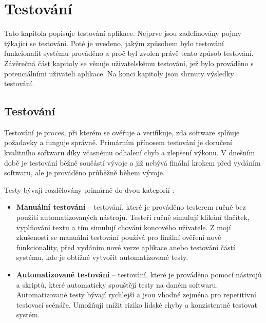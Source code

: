 \chapter{Testování}
\begin{chapterabstract}
Tato kapitola popisuje testování aplikace. Nejprve jsou zadefinovány pojmy týkající se testování. Poté je uvedeno, jakým způsobem bylo testování funkcionalit systému prováděno a proč byl zvolen právě tento způsob testování. Závěrečná část kapitoly se věnuje uživatelskému testování, jež bylo prováděno s potenciálními uživateli aplikace. Na konci kapitoly jsou shrnuty výsledky testování.
\end{chapterabstract}

\section{Testování}
Testování je proces, při kterém se ověřuje a verifikuje, zda software splňuje požadavky a funguje správně. Primárním přínosem testování je doručení kvalitního softwaru díky včasnému odhalení chyb a zlepšení výkonu. V dnešním době je testování běžně součástí vývoje a již nebývá finální krokem před vydáním softwaru, ale je prováděno průběžně během vývoje. \cite{ibm_software_testing}

Testy bývají rozdělovány primárně do dvou kategorií \cite{ibm_software_testing}: 
\begin{itemize}
    \item \textbf{Manuální testování} – testování, které je prováděno testerem ručně bez použití automatizovaných nástrojů. Testeři ručně simulují klikání tlačítek, vyplňování textu a tím simulují chování koncového uživatele. Z mojí zkušenosti se manuální testování používá pro finální ověření nové funkcionality, před vydáním nové verze aplikace anebo testování částí systému, kde je obtížné vytvořit automatizované testy.
    \item \textbf{Automatizované testování} – testování, které je prováděno pomocí nástrojů a skriptů, které automaticky spouštějí testy na daném softwaru. Automatizované testy bývají rychlejší a jsou vhodné zejména pro repetitivní testovací scénáře. Umožňují snížit riziko lidské chyby a konzistentně testovat systém.
\end{itemize}

